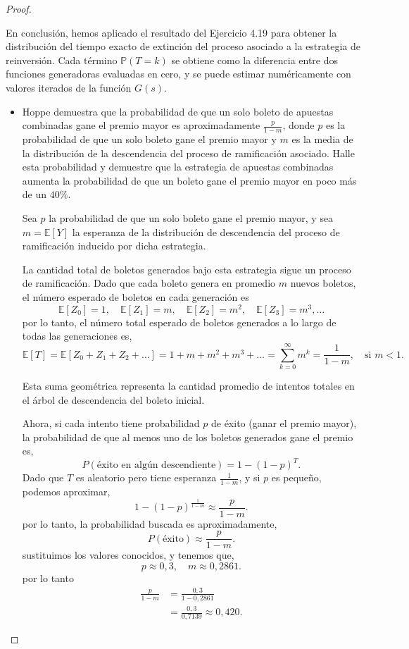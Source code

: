 \documentclass{article}
\begin{document}
\begin{proof}
\begin{itemize}
En conclusión, hemos aplicado el resultado del Ejercicio 4.19 para obtener la distribución del tiempo exacto de extinción del proceso asociado a la estrategia de reinversión. Cada término \( \mathbb{P}(T = k) \) se obtiene como la diferencia entre dos funciones generadoras evaluadas en cero, y se puede estimar numéricamente con valores iterados de la función \( G(s) \).
\end{itemize}

\begin{itemize}

\item[(d)] Hoppe demuestra que la probabilidad de que un solo boleto de apuestas combinadas gane el premio mayor es aproximadamente $\frac{p}{1 - m}$, donde $p$ es la probabilidad de que un solo boleto gane el premio mayor y $m$ es la media de la distribución de la descendencia del proceso de ramificación asociado. Halle esta probabilidad y demuestre que la estrategia de apuestas combinadas aumenta la probabilidad de que un boleto gane el premio mayor en poco más de un $40\%$.

Sea \( p \) la probabilidad de que un solo boleto gane el premio mayor, y sea \( m = \mathbb{E}[Y] \) la esperanza de la distribución de descendencia del proceso de ramificación inducido por dicha estrategia.

La cantidad total de boletos generados bajo esta estrategia sigue un proceso de ramificación. Dado que cada boleto genera en promedio \( m \) nuevos boletos, el número esperado de boletos en cada generación es
\[
\mathbb{E}[Z_0] = 1, \quad \mathbb{E}[Z_1] = m, \quad \mathbb{E}[Z_2] = m^2, \quad \mathbb{E}[Z_3] = m^3, \dots
\]
por lo tanto, el número total esperado de boletos generados a lo largo de todas las generaciones es,
\[
\mathbb{E}[T] = \mathbb{E}[Z_0 + Z_1 + Z_2 + \dots] = 1 + m + m^2 + m^3 + \dots = \sum_{k=0}^\infty m^k = \frac{1}{1 - m}, \quad \text{si } m < 1.
\]

Esta suma geométrica representa la cantidad promedio de intentos totales en el árbol de descendencia del boleto inicial.

Ahora, si cada intento tiene probabilidad \( p \) de éxito (ganar el premio mayor), la probabilidad de que al menos uno de los boletos generados gane el premio es,
\[
P(\text{éxito en algún descendiente}) = 1 - (1 - p)^T.
\]
Dado que \( T \) es aleatorio pero tiene esperanza \( \frac{1}{1 - m} \), y si \( p \) es pequeño, podemos aproximar,
\[
1 - (1 - p)^{\frac{1}{1 - m}} \approx \frac{p}{1 - m}.
\]
por lo tanto, la probabilidad buscada es aproximadamente,
\[
P(\text{éxito}) \approx \frac{p}{1 - m}.
\]
sustituimos los valores conocidos, y tenemos que,
\[
p \approx 0{,}3, \quad m \approx 0{,}2861.
\]
por lo tanto
\begin{align*}
\frac{p}{1 - m} &= \frac{0{,}3}{1 - 0{,}2861} \\
                &= \frac{0{,}3}{0{,}7139} \approx 0{,}420  . 
\end{align*}




\end{itemize}
\end{proof}
\end{document}
